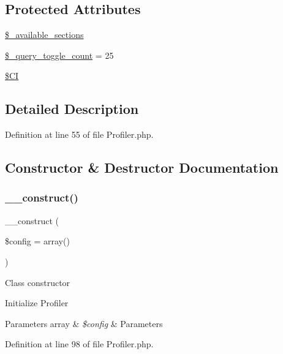 \subsection*{Protected Attributes}
\begin{DoxyCompactItemize}
\item 
\mbox{\hyperlink{class_c_i___profiler_ae30756727f63d3be7422d378676f667d}{\$\+\_\+available\+\_\+sections}}
\item 
\mbox{\hyperlink{class_c_i___profiler_a950aa6662ddde22ba9c05adffd6a20c9}{\$\+\_\+query\+\_\+toggle\+\_\+count}} = 25
\item 
\mbox{\hyperlink{class_c_i___profiler_ae0314d046ddf7fcfaec03222977427d3}{\$\+CI}}
\end{DoxyCompactItemize}


\subsection{Detailed Description}


Definition at line 55 of file Profiler.\+php.



\subsection{Constructor \& Destructor Documentation}
\mbox{\label{class_c_i___profiler_af7f9493844d2d66e924e3c1df51ce616}} 
\subsubsection{\texorpdfstring{\_\_construct()}{\_\_construct()}}
{\footnotesize\ttfamily \+\_\+\+\_\+construct (\begin{DoxyParamCaption}\item[{}]{\$config = {\ttfamily array()} }\end{DoxyParamCaption})}

Class constructor

Initialize Profiler


\begin{DoxyParams}[1]{Parameters}
array & {\em \$config} & Parameters \\
\hline
\end{DoxyParams}


Definition at line 98 of file Profiler.\+php.



